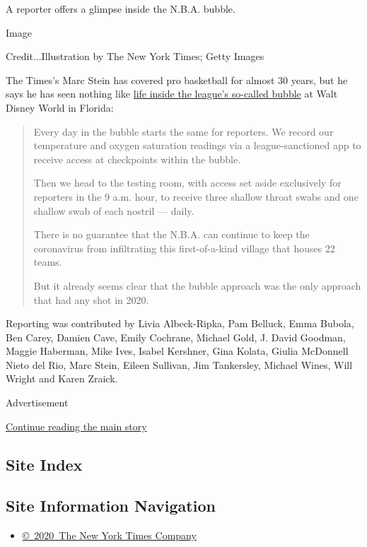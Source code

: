 A reporter offers a glimpse inside the N.B.A. bubble.

Image

Credit...Illustration by The New York Times; Getty Images

The Times's Marc Stein has covered pro basketball for almost 30 years,
but he says he has seen nothing like
\href{https://www.nytimes.com/interactive/2020/08/04/sports/nba-bubble-coronavirus.html}{life
inside the league's so-called bubble} at Walt Disney World in Florida:

\begin{quote}
Every day in the bubble starts the same for reporters. We record our
temperature and oxygen saturation readings via a league-sanctioned app
to receive access at checkpoints within the bubble.

Then we head to the testing room, with access set aside exclusively for
reporters in the 9 a.m. hour, to receive three shallow throat swabs and
one shallow swab of each nostril --- daily.

There is no guarantee that the N.B.A. can continue to keep the
coronavirus from infiltrating this first-of-a-kind village that houses
22 teams.

But it already seems clear that the bubble approach was the only
approach that had any shot in 2020.
\end{quote}

Reporting was contributed by Livia Albeck-Ripka, Pam Belluck, Emma
Bubola, Ben Carey, Damien Cave, Emily Cochrane, Michael Gold, J. David
Goodman, Maggie Haberman, Mike Ives, Isabel Kershner, Gina Kolata,
Giulia McDonnell Nieto del Rio, Marc Stein, Eileen Sullivan, Jim
Tankersley, Michael Wines, Will Wright and Karen Zraick.

Advertisement

\protect\hyperlink{after-bottom}{Continue reading the main story}

\hypertarget{site-index}{%
\subsection{Site Index}\label{site-index}}

\hypertarget{site-information-navigation}{%
\subsection{Site Information
Navigation}\label{site-information-navigation}}

\begin{itemize}
\tightlist
\item
  \href{https://help.nytimes.com/hc/en-us/articles/115014792127-Copyright-notice}{©~2020~The
  New York Times Company}
\end{itemize}

